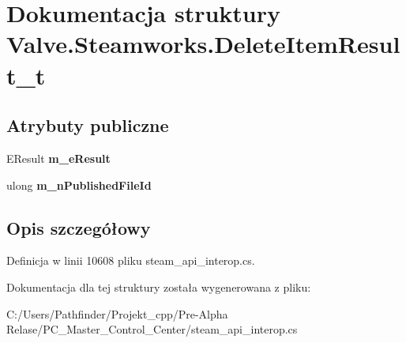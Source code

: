 \hypertarget{struct_valve_1_1_steamworks_1_1_delete_item_result__t}{}\section{Dokumentacja struktury Valve.\+Steamworks.\+Delete\+Item\+Result\+\_\+t}
\label{struct_valve_1_1_steamworks_1_1_delete_item_result__t}
\subsection*{Atrybuty publiczne}
\begin{DoxyCompactItemize}
\item 
\mbox{\label{struct_valve_1_1_steamworks_1_1_delete_item_result__t_a2a7583b107b2bed28f51c84558c656ff}} 
E\+Result {\bfseries m\+\_\+e\+Result}
\item 
\mbox{\label{struct_valve_1_1_steamworks_1_1_delete_item_result__t_a10034a5fa003adc6ac30c27676d2990c}} 
ulong {\bfseries m\+\_\+n\+Published\+File\+Id}
\end{DoxyCompactItemize}


\subsection{Opis szczegółowy}


Definicja w linii 10608 pliku steam\+\_\+api\+\_\+interop.\+cs.



Dokumentacja dla tej struktury została wygenerowana z pliku\+:\begin{DoxyCompactItemize}
\item 
C\+:/\+Users/\+Pathfinder/\+Projekt\+\_\+cpp/\+Pre-\/\+Alpha Relase/\+P\+C\+\_\+\+Master\+\_\+\+Control\+\_\+\+Center/steam\+\_\+api\+\_\+interop.\+cs\end{DoxyCompactItemize}
